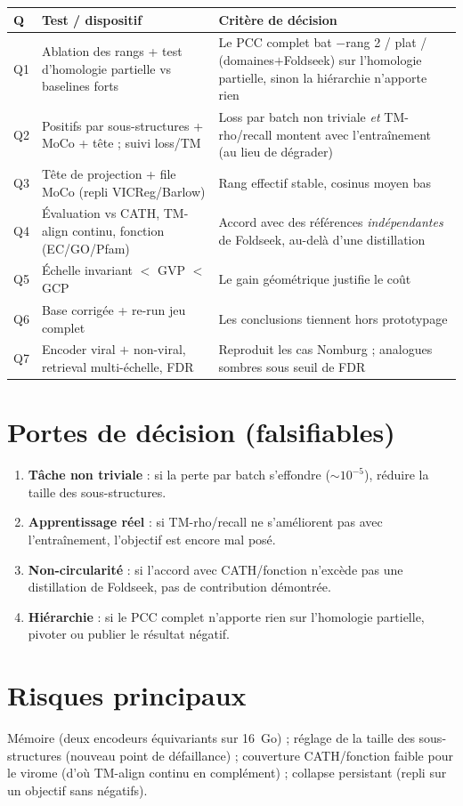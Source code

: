 \documentclass[11pt,a4paper]{article}
\begin{document}
\begin{center}\small
\begin{tabular}{@{}p{1.0cm} p{7.2cm} p{6.4cm}@{}}
\toprule
Q & Test / dispositif & Critère de décision \\
\midrule
Q1 & Ablation des rangs + test d'homologie partielle vs baselines forts & Le PCC complet bat $-$rang 2 / plat / (domaines$+$Foldseek) sur l'homologie partielle, sinon la hiérarchie n'apporte rien \\
Q2 & Positifs par sous-structures + MoCo + tête ; suivi loss/TM & Loss par batch non triviale \emph{et} TM-rho/recall montent avec l'entraînement (au lieu de dégrader) \\
Q3 & Tête de projection + file MoCo (repli VICReg/Barlow) & Rang effectif stable, cosinus moyen bas \\
Q4 & Évaluation vs CATH, TM-align continu, fonction (EC/GO/Pfam) & Accord avec des références \emph{indépendantes} de Foldseek, au-delà d'une distillation \\
Q5 & Échelle invariant $<$ GVP $<$ GCP & Le gain géométrique justifie le coût \\
Q6 & Base corrigée + re-run jeu complet & Les conclusions tiennent hors prototypage \\
Q7 & Encoder viral $+$ non-viral, retrieval multi-échelle, FDR & Reproduit les cas Nomburg ; analogues sombres sous seuil de FDR \\
\bottomrule
\end{tabular}
\end{center}

\section{Portes de décision (falsifiables)}
\begin{enumerate}[leftmargin=1.5em,itemsep=2pt]
  \item \textbf{Tâche non triviale} : si la perte par batch s'effondre ($\sim 10^{-5}$),
        réduire la taille des sous-structures.
  \item \textbf{Apprentissage réel} : si TM-rho/recall ne s'améliorent pas avec
        l'entraînement, l'objectif est encore mal posé.
  \item \textbf{Non-circularité} : si l'accord avec CATH/fonction n'excède pas une
        distillation de Foldseek, pas de contribution démontrée.
  \item \textbf{Hiérarchie} : si le PCC complet n'apporte rien sur l'homologie
        partielle, pivoter ou publier le résultat négatif.
\end{enumerate}

\section{Risques principaux}
Mémoire (deux encodeurs équivariants sur 16~Go) ; réglage de la taille des
sous-structures (nouveau point de défaillance) ; couverture CATH/fonction faible pour
le virome (d'où TM-align continu en complément) ; collapse persistant (repli sur un
objectif sans négatifs).
\end{document}
